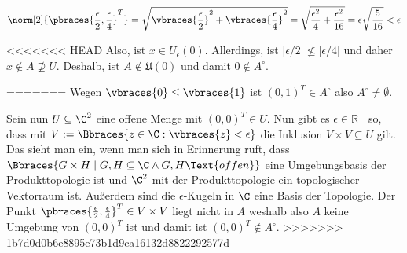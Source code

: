 \begin{solution}
\begin{enumerate}[label = (\roman*)]
\begin{itemize}[label = {}]
    \begin{align*}
      \norm[2]
      {
        \pbraces
        {
          \frac{\epsilon}{2},
          \frac{\epsilon}{4}
        }^T
      }
      =
      \sqrt
      {
        \vbraces{\frac{\epsilon}{2}}^2 +
        \vbraces{\frac{\epsilon}{4}}^2
      }
      =
      \sqrt
      {
        \frac{\epsilon^2}{4} +
        \frac{\epsilon^2}{16}
      }
      =
      \epsilon
      \sqrt
      {
        \frac{5}{16}
      }
      < \epsilon
    \end{align*}

<<<<<<< HEAD
    Also, ist $x \in U_\epsilon(0)$.
    Allerdings, ist $|\epsilon / 2| \not \leq |\epsilon / 4| $ und daher $x \notin A \not \supseteq U$.
    Deshalb, ist $A \notin \mathfrak{U}(0)$ und damit $0 \notin A^\circ$.

  \end{itemize}
=======
  Wegen $\vbraces{0} \leq \vbraces{1}$ ist $(0,1)^T \in A^\circ$ also $A^\circ \neq \emptyset$.

  Sein nun $U \subseteq \C^2$ eine offene Menge mit $(0,0)^T \in U$. Nun gibt es $\epsilon \in \mathbb{R}^+$ so, dass mit $V:= \Bbraces{z \in \C : \vbraces{z} < \epsilon}$ die Inklusion $V \times V \subseteq U$ gilt. Das sieht man ein, wenn man sich in Erinnerung ruft, dass $\Bbraces{G \times H \mid G,H \subseteq \C \land G,H \Text{ offen}}$ eine Umgebungsbasis der Produkttopologie ist und $\C^2$ mit der Produkttopologie ein topologischer Vektorraum ist. Außerdem sind die $\epsilon$-Kugeln in $\C$ eine Basis der Topologie. Der Punkt $\pbraces{\frac{\epsilon}{2}, \frac{\epsilon}{4} }^T \in V \times V$ liegt nicht in $A$ weshalb also $A$ keine Umgebung von $(0,0)^T$ ist und damit ist $(0,0)^T \notin A^\circ$.
>>>>>>> 1b7d0d0b6e8895e73b1d9ca16132d8822292577d

\end{enumerate}

\end{solution}
